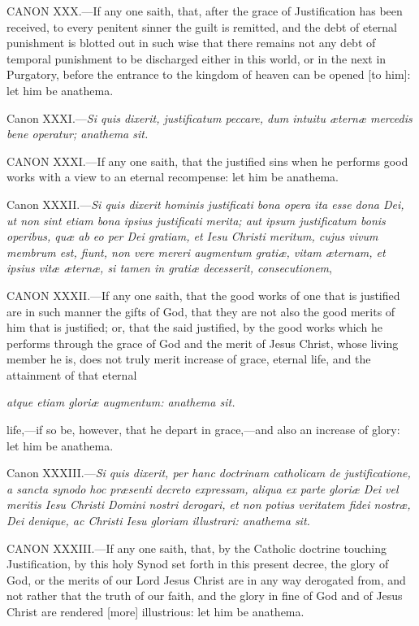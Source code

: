 CANON XXX.—If any one saith, that, after the grace of Justification has been received, to every penitent sinner the guilt is remitted, and the debt of eternal punishment is blotted out in such wise that there remains not any debt of temporal punishment to be discharged either in this world, or in the next in Purgatory, before the entrance to the kingdom of heaven can be opened [to him]: let him be anathema.

Canon XXXI.—\emph{Si quis dixerit, justificatum peccare, dum intuitu æternæ mercedis bene operatur; anathema sit.}

CANON XXXI.—If any one saith, that the justified sins when he performs good works with a view to an eternal recompense: let him be anathema.

Canon XXXII.—\emph{Si quis dixerit hominis justificati bona opera ita esse dona Dei, ut non sint etiam bona ipsius justificati merita; aut ipsum justificatum bonis operibus, quæ ab eo per Dei gratiam, et Iesu Christi meritum, cujus vivum membrum est, fiunt, non vere mereri augmentum gratiæ, vitam æternam, et ipsius vitæ æternæ, si tamen in gratiæ decesserit, consecutionem},

CANON XXXII.—If any one saith, that the good works of one that is justified are in such manner the gifts of God, that they are not also the good merits of him that is justified; or, that the said justified, by the good works which he performs through the grace of God and the merit of Jesus Christ, whose living member he is, does not truly merit increase of grace, eternal life, and the attainment of that eternal

\emph{atque etiam gloriæ augmentum: anathema sit.}

life,—if so be, however, that he depart in grace,—and also an increase of glory: let him be anathema.

Canon XXXIII.—\emph{Si quis dixerit, per hanc doctrinam catholicam de justificatione, a sancta synodo hoc præsenti decreto expressam, aliqua ex parte gloriæ Dei vel meritis Iesu Christi Domini nostri derogari, et non potius veritatem fidei nostræ, Dei denique, ac Christi Iesu gloriam illustrari: anathema sit.}

CANON XXXIII.—If any one saith, that, by the Catholic doctrine touching Justification, by this holy Synod set forth in this present decree, the glory of God, or the merits of our Lord Jesus Christ are in any way derogated from, and not rather that the truth of our faith, and the glory in fine of God and of Jesus Christ are rendered [more] illustrious: let him be anathema.

